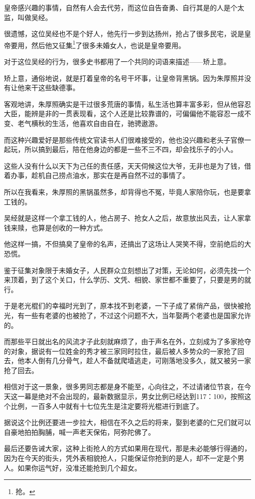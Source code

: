 \begin{multicols}{\theparacolNo}
皇帝感兴趣的事情，自然有人会去代劳，而这位自告奋勇、自行其是的人是个太监，叫做吴经。

很遗憾，这位吴经也不是个好人，他先行一步到达扬州，抢占了很多民宅，说是皇帝要用，然后他又征集\footnote{抢。}了很多未婚女人，也说是皇帝要用。

对于这位吴经的行为，很多史书都用了一个共同的词语来描述——矫上意。

矫上意，通俗地说，就是打着皇帝的名号干坏事，让皇帝背黑锅。因为朱厚照并没有让他来干这些缺德事。

客观地讲，朱厚照确实是干过很多荒唐的事情，私生活也算丰富多彩，但从他容忍大臣，能辨是非的一贯表现看，这个人还是比较靠谱的，可偏偏他不能容忍一成不变、老气横秋的生活，他喜欢自由自在，驰骋遨游。

而这种兴趣爱好是那些传统文官读书人们很难接受的，他也没兴趣和老头子官僚一起玩，所以搞到最后，陪在他身边的都是一些不三不四，却会找乐子的小人。

这些人没有什么以天下为己任的责任感，天天伺候这位大爷，无非也是为了钱，借着办事，趁机自己捞点油水，那实在是再自然不过的事情了。

所以在我看来，朱厚照的黑锅虽然多，却背得也不冤，毕竟人家陪你玩，也是要拿工钱的。

吴经就是这样一个拿工钱的人，他占房子、抢女人之后，故意放出风去，让人家拿钱来赎，也算是创收的一种方式。

他这样一搞，不但搞臭了皇帝的名声，还搞出了这场让人哭笑不得，空前绝后的大恐慌。

鉴于征集对象限于未婚女子，人民群众立刻想出了对策，无论如何，必须先找一个来顶着，到了这个关口，什么学历、文凭、相貌、家世都不重要了，只要是男的就行。

于是老光棍们的幸福时光到了，原本找不到老婆，一下子成了紧俏产品，很快被抢光，有一些有老婆的也被抢了，不过这个问题不大，当年娶两个老婆也是国家允许的。

而那些平日就出名的风流才子此刻就麻烦了，由于声名在外，立刻成为了多家抢夺的对象，据说有一位姓金的秀才被三家同时拉住，最后被人多势众的一家抢了回去，他本人倒有几分骨气，趁人不备就爬墙逃走，可刚落地没多久，就又被另一家抢了回去。

相信对于这一景象，很多男同志都是身不能至，心向往之，不过请诸位节哀，在今天这一幕是绝对不会出现的，最新数据显示，男女比例已经达到117：100，按照这个比例，一百多人中就有十七位先生是注定要将光棍进行到底了。

据说这个比例还要进一步拉大，相信在不久之后的将来，娶到老婆的仁兄们就可以自豪地拍拍胸脯，喊一声老天保佑，阿弥陀佛了。

最后还要告诫大家，这种上街抢人的方式如果用在现代，那是未必能够行得通的，因为在今天的街头，凭外表相貌抢人，只能保证你抢到的是人，却不一定是个男人。如果你运气好，没准还能抢到几个超女。


\end{multicols}
